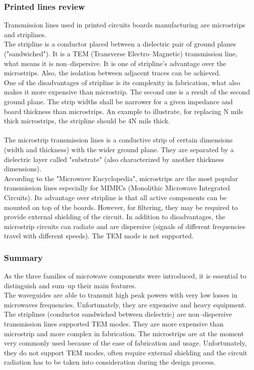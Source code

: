 \documentclass[a4paper, 11pt]{report}
\begin{document}
\subsubsection{Printed lines review}
Transmission lines used in printed circuits boards manufacturing are microstrips and striplines.\\
The stripline is a conductor placed between a dielectric pair of ground planes ("sandwiched"). It is a TEM (Transverse Electro--Magnetic) transmission line, what means it is non--dispersive. It is one of stripline's advantage over the microstrips. Also, the isolation between adjacent traces can be achieved.\\
One of the disadvantages of stripline is its complexity in fabrication, what also makes it more expensive than microstrip. The second one is a result of the second ground plane. The strip widths shall be narrower for a given impedance and board thickness than microstrips. 
An example to illustrate, for replacing N mils thick microstrips, the stripline should be 4N mils thick.
\\
\\
The microstrip transmission lines is a conductive strip of certain dimensions (width and thickness) with the wider ground plane. They are separated by a dielectric layer called "substrate" (also characterized by another thickness dimensions). \\According to the "Microwave Encyclopedia", microstrips are the most popular transmission lines especially for MIMICs (Monolithic Microwave Integrated Circuits).
Its advantage over stripline is that all active components can be mounted on top of the boards. However, for filtering, they may be required to provide external shielding of the circuit. In addition to disadvantages, the microstrip circuits can radiate and are dispersive (signals of different frequencies travel with different speeds). The TEM mode is not supported.

\subsubsection{Summary}
As the three families of microwave components were introduced, it is essential to distinguish and sum--up their main features.\\
The waveguides are able to transmit high peak powers with very low losses in microwaves frequencies. Unfortunately, they are expensive and heavy equipment.
The striplines (conductor sandwiched between dielectric) are non--dispersive transmission lines supported TEM modes. They are more expensive than microstrip and more complex in fabrication.
The microstrips are at the moment very commonly used because of the ease of fabrication and usage. Unfortunately, they do not support TEM modes, often require external shielding and the circuit radiation has to be taken into consideration during the design process.
\end{document}
